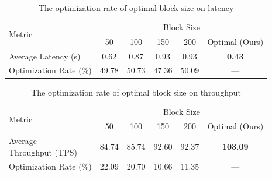 \documentclass[a4paper,fleqn]{cas-dc}
\begin{document}
\begin{table}[!htbp]
	\centering
	\footnotesize
	\caption{The optimization rate of optimal block size on latency}
	\label{tab:dw_dqn_latency}
	\setlength{\tabcolsep}{3pt}
	\begin{tabular}{@{}l*{5}{c}@{}}
		\toprule
		\multirow{2}{*}{Metric} & \multicolumn{5}{c}{Block Size} \\
		\cmidrule(lr){2-6}
		& 50 & 100 & 150 & 200 & Optimal (Ours) \\
		\midrule
		Average Latency (s) & 0.62 & 0.87 & 0.93 & 0.93 & \textbf{0.43} \\
		Optimization Rate (\%) & 49.78 & 50.73 & 47.36 & 50.09 & --- \\
		\bottomrule
	\end{tabular}
\end{table}



\begin{table}[!htbp]
	\centering
	\caption{The optimization rate of optimal block size on throughput}
	\label{tab:dw_dqn_throughput}
	\setlength{\tabcolsep}{3pt} %
	\footnotesize
	\begin{tabular}{@{}lccccc@{}}
		\toprule
		\multirow{2}{*}{Metric} & \multicolumn{5}{c}{Block Size} \\
		\cmidrule(lr){2-6}
		& 50 & 100 & 150 & 200 & Optimal (Ours) \\
		\midrule
		\makecell[l]{Average\\Throughput (TPS)} & 84.74 & 85.74 & 92.60 & 92.37 & \textbf{103.09} \\
		Optimization Rate (\%) & 22.09 & 20.70 & 10.66 & 11.35 & --- \\ %
		\bottomrule
	\end{tabular}
\end{table}


\end{document}
